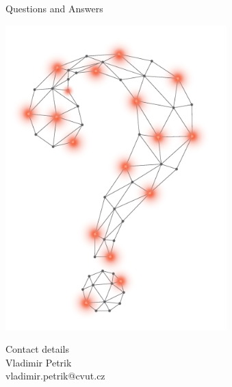 \documentclass{agimusslidesschool}
\begin{document}
    \begin{frame}{Questions and Answers}
        \begin{minipage}[t]{0.5\textwidth}
            \vspace{0pt}
            \includegraphics[width=0.5\linewidth]{figs_school/question_mark}
        \end{minipage}%
        \begin{minipage}[t]{0.5\textwidth}
            \vspace{0pt}
            \flushright
            \vspace{2cm}
            \alert{\large Contact details} \\[\agimustitlesep]
            Vladimir Petrik \\
            vladimir.petrik@cvut.cz
        \end{minipage}

    \end{frame}
\end{document}
